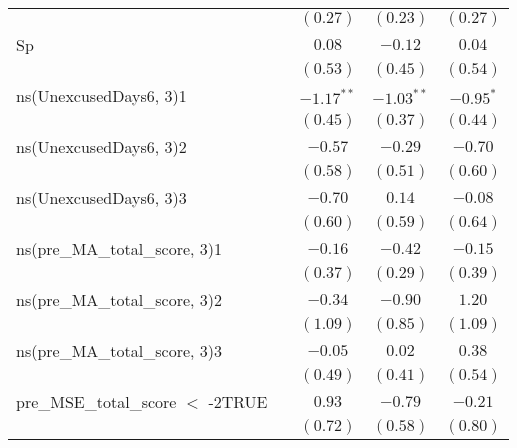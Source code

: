 \begin{center}
\begin{longtable}{l c c c c}
                                                   &              & $(0.27)$     & $(0.23)$     & $(0.27)$     \\
Sp                                                 &              & $0.08$       & $-0.12$      & $0.04$       \\
                                                   &              & $(0.53)$     & $(0.45)$     & $(0.54)$     \\
ns(UnexcusedDays6, 3)1                             &              & $-1.17^{**}$ & $-1.03^{**}$ & $-0.95^{*}$  \\
                                                   &              & $(0.45)$     & $(0.37)$     & $(0.44)$     \\
ns(UnexcusedDays6, 3)2                             &              & $-0.57$      & $-0.29$      & $-0.70$      \\
                                                   &              & $(0.58)$     & $(0.51)$     & $(0.60)$     \\
ns(UnexcusedDays6, 3)3                             &              & $-0.70$      & $0.14$       & $-0.08$      \\
                                                   &              & $(0.60)$     & $(0.59)$     & $(0.64)$     \\
ns(pre\_MA\_total\_score, 3)1                      &              & $-0.16$      & $-0.42$      & $-0.15$      \\
                                                   &              & $(0.37)$     & $(0.29)$     & $(0.39)$     \\
ns(pre\_MA\_total\_score, 3)2                      &              & $-0.34$      & $-0.90$      & $1.20$       \\
                                                   &              & $(1.09)$     & $(0.85)$     & $(1.09)$     \\
ns(pre\_MA\_total\_score, 3)3                      &              & $-0.05$      & $0.02$       & $0.38$       \\
                                                   &              & $(0.49)$     & $(0.41)$     & $(0.54)$     \\
pre\_MSE\_total\_score $<$ -2TRUE                  &              & $0.93$       & $-0.79$      & $-0.21$      \\
                                                   &              & $(0.72)$     & $(0.58)$     & $(0.80)$     \\

\end{longtable}
\end{center}
